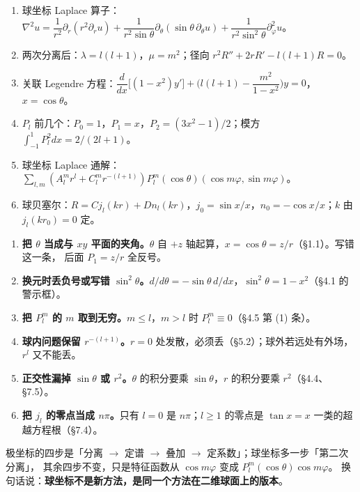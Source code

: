 \begin{enumerate}[label=\textbf{(\arabic*)}]
  \item 球坐标 Laplace 算子：
        $\nabla^2u=\dfrac{1}{r^2}\partial_r(r^2\partial_ru)+\dfrac{1}{r^2\sin\theta}\partial_\theta(\sin\theta\,\partial_\theta u)+\dfrac{1}{r^2\sin^2\theta}\partial_\varphi^2u$。
  \item 两次分离后：$\lambda=l(l+1)$，$\mu=m^2$；径向 $r^2R''+2rR'-l(l+1)R=0$。
  \item 关联 Legendre 方程：$\dfrac{d}{dx}\Big[(1-x^2)y'\Big]+\Big(l(l+1)-\dfrac{m^2}{1-x^2}\Big)y=0$，$x=\cos\theta$。
  \item $P_l$ 前几个：$P_0=1$，$P_1=x$，$P_2=(3x^2-1)/2$；模方 $\int_{-1}^1P_l^2dx=2/(2l+1)$。
  \item 球坐标 Laplace 通解：$\sum_{l,m}(A_l^mr^l+C_l^mr^{-(l+1)})P_l^m(\cos\theta)(\cos m\varphi,\sin m\varphi)$。
  \item 球贝塞尔：$R=Cj_l(kr)+Dn_l(kr)$，$j_0=\sin x/x$，$n_0=-\cos x/x$；$k$ 由 $j_l(kr_0)=0$ 定。
\end{enumerate}


\begin{enumerate}[label=\textbf{\arabic*.}]
  \item \textbf{把 $\theta$ 当成与 $xy$ 平面的夹角。}$\theta$ 自 $+z$ 轴起算，$x=\cos\theta=z/r$（\S1.1）。写错这一条，
        后面 $P_1=z/r$ 全反号。
  \item \textbf{换元时丢负号或写错 $\sin^2\theta$。}$d/d\theta=-\sin\theta\,d/dx$，$\sin^2\theta=1-x^2$（\S4.1 的警示框）。
  \item \textbf{把 $P_l^m$ 的 $m$ 取到无穷。}$m\le l$，$m>l$ 时 $P_l^m\equiv0$（\S4.5 第 (1) 条）。
  \item \textbf{球内问题保留 $r^{-(l+1)}$。}$r=0$ 处发散，必须丢（\S5.2）；球外若远处有外场，$r^l$ 又不能丢。
  \item \textbf{正交性漏掉 $\sin\theta$ 或 $r^2$。}$\theta$ 的积分要乘 $\sin\theta$，$r$ 的积分要乘 $r^2$（\S4.4、\S7.5）。
  \item \textbf{把 $j_l$ 的零点当成 $n\pi$。}只有 $l=0$ 是 $n\pi$；$l\ge1$ 的零点是 $\tan x=x$ 一类的超越方程根（\S7.4）。
\end{enumerate}


极坐标的四步是「分离 $\to$ 定谱 $\to$ 叠加 $\to$ 定系数」；球坐标多一步「第二次分离」，
其余四步不变，只是特征函数从 $\cos m\varphi$ 变成 $P_l^m(\cos\theta)\cos m\varphi$。
换句话说：\textbf{球坐标不是新方法，是同一个方法在二维球面上的版本}。


